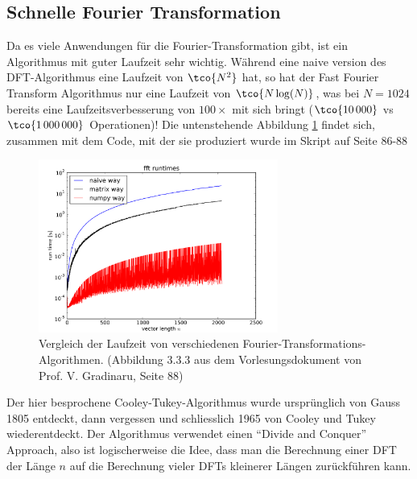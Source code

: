 \newsection
\subsection{Schnelle Fourier Transformation}
Da es viele Anwendungen für die Fourier-Transformation gibt, ist ein Algorithmus mit guter Laufzeit sehr wichtig.
Während eine naive version des DFT-Algorithmus eine Laufzeit von $\tco{N^2}$ hat,
so hat der Fast Fourier Transform Algorithmus nur eine Laufzeit von $\tco{N \log(N)}$,
was bei $N = 1024$ bereits eine Laufzeitsverbesserung von $100\times$ mit sich bringt ($\tco{10\,000}$ vs $\tco{1\,000\,000}$ Operationen)!
Die untenstehende Abbildung \ref{fig:trigo-interp-fft-runtimes} findet sich, zusammen mit dem Code,
mit der sie produziert wurde im Skript auf Seite 86-88

\begin{figure}[h!]
    \begin{center}
        \includegraphics[width=0.7\textwidth]{assets/01_interpolation/01_trigonometric/fft-runtimes.png}
    \end{center}
    \caption{Vergleich der Laufzeit von verschiedenen Fourier-Transformations-Algorithmen.
    (Abbildung 3.3.3 aus dem Vorlesungsdokument von Prof. V. Gradinaru, Seite 88)}
    \label{fig:trigo-interp-fft-runtimes}
\end{figure}

Der hier besprochene Cooley-Tukey-Algorithmus wurde ursprünglich von Gauss 1805 entdeckt, dann vergessen und schliesslich 1965 von Cooley und Tukey wiederentdeckt.
Der Algorithmus verwendet einen ``Divide and Conquer'' Approach, also ist logischerweise die Idee,
dass man die Berechnung einer DFT der Länge $n$ auf die Berechnung vieler DFTs kleinerer Längen zurückführen kann.


